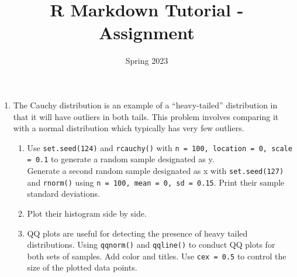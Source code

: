 \documentclass[12pt]{article}
\title{R Markdown Tutorial - Assignment}
\date{Spring 2023}
\begin{document}
\maketitle

\begin{enumerate}
    \item The Cauchy distribution is an example of a “heavy-tailed” distribution in that it will have outliers in both tails. This problem involves comparing it with a normal distribution which typically has very few outliers.
    \begin{enumerate}
        \item   Use \texttt{set.seed(124)} and \texttt{rcauchy()} with \texttt{n = 100, location = 0, scale = 0.1} to generate a random sample designated as y. \\
        Generate a second random sample designated as x with \texttt{set.seed(127)} and \texttt{rnorm()} using \texttt{n = 100, mean = 0, sd = 0.15}. Print their sample standard deviations. 
        \item   Plot their histogram side by side.
        \item   QQ plots are useful for detecting the presence of heavy tailed distributions. Using \texttt{qqnorm()} and \texttt{qqline()} to conduct QQ plots for both sets of samples. Add color and titles. Use \texttt{cex = 0.5} to control the size of the plotted data points.
    \end{enumerate}
\end{enumerate}
\end{document}
